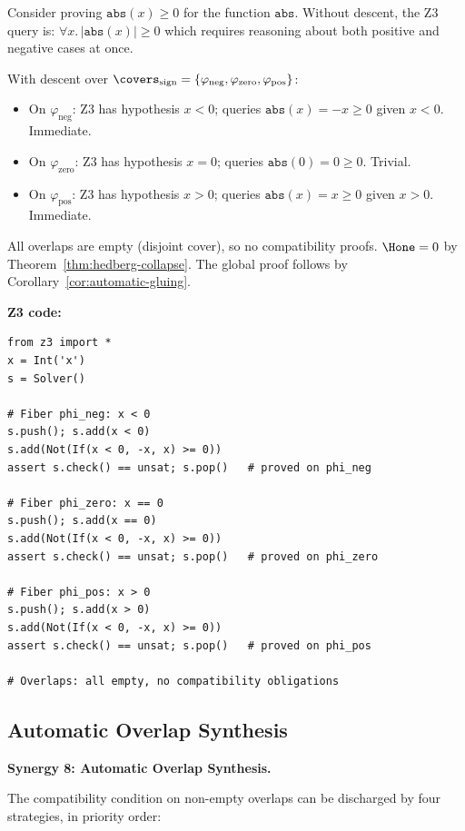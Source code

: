 \begin{example}
\label{ex:hypothesis-pushing}
Consider proving $\mathtt{abs}(x) \ge 0$ for the function
$\mathtt{abs}$.  Without descent, the Z3 query is:
$\forall x.\, |\mathtt{abs}(x)| \ge 0$
which requires reasoning about both positive and negative cases at once.

With descent over $\covers_{\mathrm{sign}} =
\{\varphi_{\mathrm{neg}}, \varphi_{\mathrm{zero}}, \varphi_{\mathrm{pos}}\}$:
\begin{itemize}
\item On $\varphi_{\mathrm{neg}}$: Z3 has hypothesis $x < 0$; queries
  $\mathtt{abs}(x) = -x \ge 0$ given $x < 0$.  Immediate.
\item On $\varphi_{\mathrm{zero}}$: Z3 has hypothesis $x = 0$; queries
  $\mathtt{abs}(0) = 0 \ge 0$.  Trivial.
\item On $\varphi_{\mathrm{pos}}$: Z3 has hypothesis $x > 0$; queries
  $\mathtt{abs}(x) = x \ge 0$ given $x > 0$.  Immediate.
\end{itemize}
All overlaps are empty (disjoint cover), so no compatibility proofs.
$\Hone = 0$ by Theorem~\ref{thm:hedberg-collapse}.  The global proof
follows by Corollary~\ref{cor:automatic-gluing}.

\medskip\noindent
\textbf{Z3 code:}
\begin{lstlisting}
from z3 import *
x = Int('x')
s = Solver()

# Fiber phi_neg: x < 0
s.push(); s.add(x < 0)
s.add(Not(If(x < 0, -x, x) >= 0))
assert s.check() == unsat; s.pop()   # proved on phi_neg

# Fiber phi_zero: x == 0
s.push(); s.add(x == 0)
s.add(Not(If(x < 0, -x, x) >= 0))
assert s.check() == unsat; s.pop()   # proved on phi_zero

# Fiber phi_pos: x > 0
s.push(); s.add(x > 0)
s.add(Not(If(x < 0, -x, x) >= 0))
assert s.check() == unsat; s.pop()   # proved on phi_pos

# Overlaps: all empty, no compatibility obligations
\end{lstlisting}
\end{example}

\subsection{Automatic Overlap Synthesis}

\noindent\textbf{Synergy 8: Automatic Overlap Synthesis.}

The compatibility condition on non-empty overlaps can be discharged by four
strategies, in priority order:

